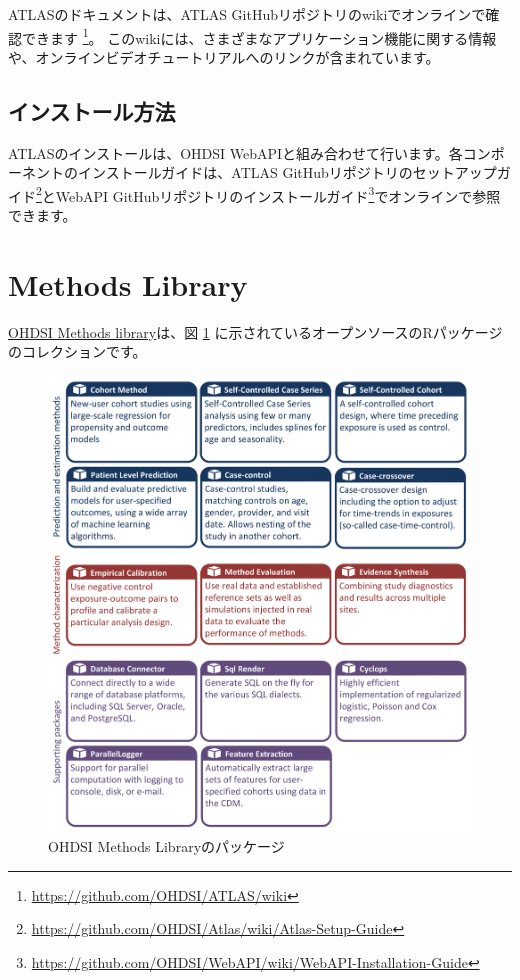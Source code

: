 \documentclass[
  11pt]{book}
\theoremstyle{definition}
\theoremstyle{definition}
\theoremstyle{definition}
\theoremstyle{definition}
\theoremstyle{remark}
\begin{document}
ATLASのドキュメントは、ATLAS GitHubリポジトリのwikiでオンラインで確認できます \footnote{\url{https://github.com/OHDSI/ATLAS/wiki}}。 このwikiには、さまざまなアプリケーション機能に関する情報や、オンラインビデオチュートリアルへのリンクが含まれています。 

\subsection{インストール方法}\label{ux30a4ux30f3ux30b9ux30c8ux30fcux30ebux65b9ux6cd5}

ATLASのインストールは、OHDSI WebAPIと組み合わせて行います。各コンポーネントのインストールガイドは、ATLAS GitHubリポジトリのセットアップガイド\footnote{\url{https://github.com/OHDSI/Atlas/wiki/Atlas-Setup-Guide}}とWebAPI GitHubリポジトリのインストールガイド\footnote{\url{https://github.com/OHDSI/WebAPI/wiki/WebAPI-Installation-Guide}}でオンラインで参照できます。 

\section{Methods Library}\label{methods-library}

\href{https://ohdsi.github.io/MethodsLibrary/}{OHDSI Methods library}は、図 \ref{fig:methodsLibrary} に示されているオープンソースのRパッケージのコレクションです。 

\begin{figure}

{\centering \includegraphics[width=1\linewidth]{images/OhdsiAnalyticsTools/methodsLibrary} 

}

\caption{OHDSI Methods Libraryのパッケージ}\label{fig:methodsLibrary}
\end{figure}
\end{document}
